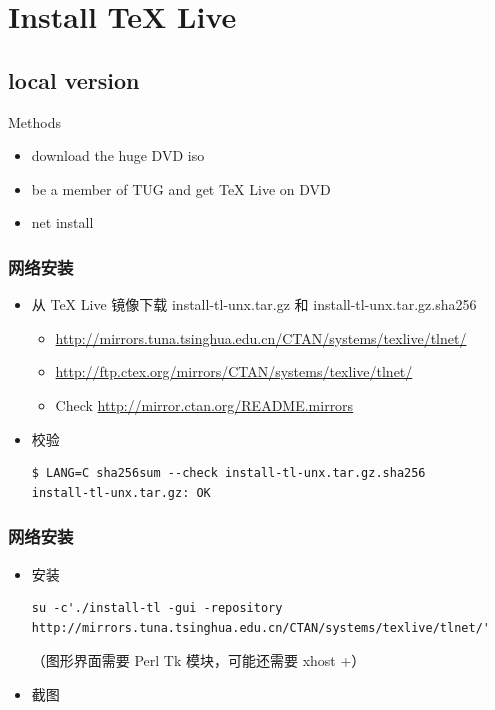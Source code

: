 \documentclass{beamer}
\def\TeXLive{\TeX{} Live\xspace}
\let\TL=\TeXLive
\begin{document}
\section{Install \TL}
\subsection{local version}
\begin{frame}{Methods}
  \begin{itemize}
    \item download the huge DVD iso
    \item be a member of TUG and get \TL on DVD
      \pause
    \item net install
  \end{itemize}
\end{frame}

\begin{frame}[fragile]
  \frametitle{网络安装}
  \begin{itemize}
    \item 
从 \TeXLive 镜像下载
install-tl-unx.tar.gz
和
install-tl-unx.tar.gz.sha256
\begin{itemize} %
  \item \url{http://mirrors.tuna.tsinghua.edu.cn/CTAN/systems/texlive/tlnet/}
  \item \url{http://ftp.ctex.org/mirrors/CTAN/systems/texlive/tlnet/}
  \item Check \url{http://mirror.ctan.org/README.mirrors}
\end{itemize}

\item 校验
\begin{lstlisting}
$ LANG=C sha256sum --check install-tl-unx.tar.gz.sha256 
install-tl-unx.tar.gz: OK
\end{lstlisting}

  \end{itemize}
\end{frame}

\begin{frame}[fragile]
  \frametitle{网络安装}
  \begin{itemize}
    \item 安装
      \begin{lstlisting}
su -c'./install-tl -gui -repository http://mirrors.tuna.tsinghua.edu.cn/CTAN/systems/texlive/tlnet/'
      \end{lstlisting}

（图形界面需要 Perl Tk 模块，可能还需要 xhost +）

\item 截图
\end{itemize}
\end{frame}
\end{document}
